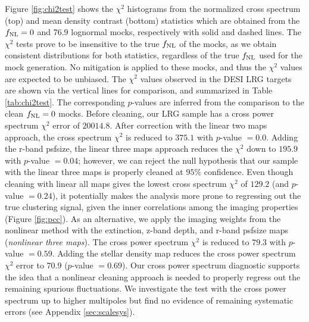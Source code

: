 Figure \ref{fig:chi2test} shows the $\chi^{2}$ histograms from the normalized cross spectrum (top) and mean density contrast (bottom) statistics which are obtained from the $f_{\rm NL}=0$ and $76.9$ lognormal mocks, respectively with solid and dashed lines. The $\chi^{2}$ tests prove to be insensitive to the true $f_{\rm NL}$ of the mocks, as we obtain consistent distributions for both statistics, regardless of the true $f_{\rm NL}$ used for the mock generation. No mitigation is applied to these mocks, and thus the $\chi^{2}$ values are expected to be unbiased. The $\chi^{2}$ values observed in the DESI LRG targets are shown via the vertical lines for comparison, and summarized in Table \ref{tab:chi2test}. The corresponding $p$-values are inferred from the comparison to the clean $f_{\rm NL}=0$ mocks. Before cleaning, our LRG sample has a cross power spectrum $\chi^{2}$ error of $20014.8$. After correction with the linear two maps approach, the cross spectrum $\chi^{2}$ is reduced to $375.1$ with $p$-value $=0.0$. Adding the r-band psfsize, the linear three maps approach reduces the $\chi^{2}$ down to $195.9$ with $p$-value $=0.04$; however, we can reject the null hypothesis that our sample with the linear three maps is properly cleaned at $95\%$ confidence. Even though cleaning with linear all maps gives the lowest cross spectrum $\chi^{2}$ of $129.2$ (and $p$-value $=0.24$), it potentially makes the analysis more prone to regressing out the true clustering signal, given the inner correlations among the imaging properties (Figure \ref{fig:pcc}). As an alternative, we apply the imaging weights from the nonlinear method with the extinction, z-band depth, and r-band psfsize maps (\textit{nonlinear three maps}). The cross power spectrum $\chi^{2}$ is reduced to $79.3$ with $p$-value $=0.59$. Adding the stellar density map reduces the cross power spectrum $\chi^{2}$ error to $70.9$ ($p$-value $=0.69$). Our cross power spectrum diagnostic supports the idea that a nonlinear cleaning approach is needed to properly regress out the remaining spurious fluctuations. We investigate the test with the cross power spectrum up to higher multipoles but find no evidence of remaining systematic errors (see Appendix \ref{sec:scalesys}). 



